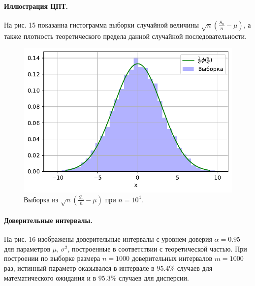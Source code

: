 \documentclass[16pt]{article}
\begin{document}
\paragraph{Иллюстрация ЦПТ.} На рис. 15 показанна гистограмма выборки случайной величины $\sqrt{n}\left(\frac{S_n}{n} - \mu\right)$, а также плотность теоретического предела данной случайной последовательности.

\begin{figure}[h]
	\center
	\includegraphics[scale=0.7]{5_2.pdf}
	\caption{Выборка из $\sqrt{n}\left(\frac{S_n}{n} - \mu\right)$ при $n = 10^4$.}
\end{figure}

\paragraph{Доверительные интервалы.} На рис. 16 изображены доверительные интервалы с уровнем доверия $\alpha = 0.95$ для параметров $\mu,\, \sigma^2$, построенные в соответствии с теоретической частью. При построении по выборке размера $n = 1000$ доверительных интервалов $m = 1000$ раз, истинный параметр оказывался в интервале в $95.4\%$ случаев для математического ожидания и в $95.3\%$ случаев для дисперсии.
\end{document}
